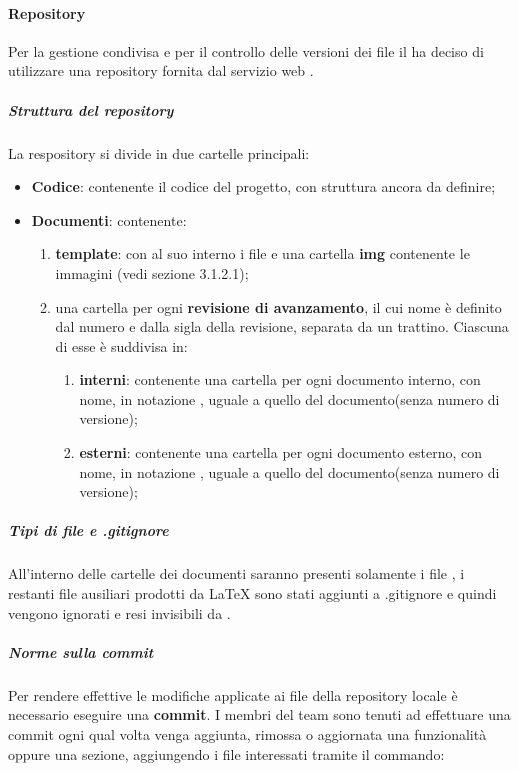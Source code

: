 	\paragraph{Repository}
	Per la gestione condivisa e per il controllo delle versioni dei file il  ha deciso di utilizzare una repository fornita dal servizio web .
		\subparagraph{Struttura del repository}
		La respository si divide in due cartelle principali:
		\begin{itemize}
			\item \textbf{Codice}: contenente il codice del progetto, con struttura ancora da definire;
			\item \textbf{Documenti}: contenente:
			\begin{enumerate}
				\item \textbf{template}: con al suo interno i file  e una cartella \textbf{img} contenente le immagini (vedi sezione 3.1.2.1);
				\item una cartella per ogni \textbf{revisione di avanzamento}, il cui nome è definito dal numero e dalla sigla della revisione, separata da un trattino. Ciascuna di esse è suddivisa in:
				\begin{enumerate}
					\item \textbf{interni}: contenente una cartella per ogni documento interno, con nome, in notazione , uguale a quello del documento(senza numero di versione);
					\item \textbf{esterni}: contenente una cartella per ogni documento esterno, con nome, in notazione , uguale a quello del documento(senza numero di versione);
				\end{enumerate}
			\end{enumerate}
		\end{itemize}
		\subparagraph{Tipi di file e .gitignore}
		All'interno delle cartelle dei documenti saranno presenti solamente i file , i restanti file ausiliari prodotti da \LaTeX{} sono stati aggiunti a .gitignore e quindi vengono ignorati e resi invisibili da .
		\subparagraph{Norme sulla commit}
		Per rendere effettive le modifiche applicate ai file della repository locale è necessario eseguire una \textbf{commit}.
		I membri del team sono tenuti ad effettuare una commit ogni qual volta venga aggiunta, rimossa o aggiornata una funzionalità oppure una sezione, aggiungendo i file interessati tramite il commando:
		\begin{center}
		\end{center}
